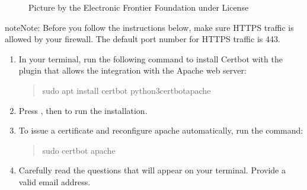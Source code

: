 \documentclass[a4paper,10pt,english,openany,oneside]{sphinxmanual}
\begin{document}
\begin{sloppypar}
\begin{figure}[H]
\noindent{}
\caption{Picture by the Electronic Frontier Foundation under \sphinxfootnotemark[13] License}\label{\detokenize{joomla-to-vps:id3}}\end{figure}
%
\begin{footnotetext}[13]\label{\thesphinxscope.13}%
\sphinxAtStartFootnote
{}
%
\end{footnotetext}\ignorespaces 
\begin{sphinxadmonition}{note}{Note:}
\sphinxAtStartPar
Before you follow the instructions below, make sure HTTPS traffic is allowed by your firewall. The default port number for HTTPS traffic is 443.
\end{sphinxadmonition}
\begin{enumerate}
%
\item {} 
\sphinxAtStartPar
In your terminal, run the following command to install Certbot with the plugin that allows the integration with the Apache web server:
\begin{quote}

\begin{sphinxVerbatim}[commandchars=\\\{\}]
\PYGZdl{} sudo apt install certbot python3\PYGZhy{}certbot\PYGZhy{}apache
\end{sphinxVerbatim}
\end{quote}

\item {} 
\sphinxAtStartPar
Press , then  to run the installation.

\item {} 
\sphinxAtStartPar
To issue a certificate and reconfigure apache automatically, run the command:
\begin{quote}

\begin{sphinxVerbatim}[commandchars=\\\{\}]
\PYGZdl{} sudo certbot \PYGZhy{}\PYGZhy{}apache
\end{sphinxVerbatim}
\end{quote}

\item {} 
\sphinxAtStartPar
Carefully read the questions that will appear on your terminal. Provide a valid email address.


\end{enumerate}
\end{sloppypar}
\end{document}
